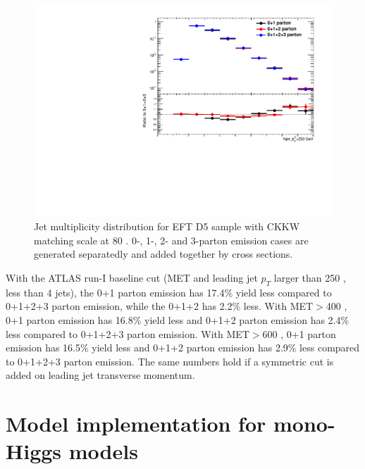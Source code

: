 \begin{figure}[h!]
	\centering  
	\includegraphics[width=0.8\linewidth]{figures/monojet_appendix/h_njet250.pdf}
	\caption{Jet multiplicity distribution for EFT D5 sample with CKKW matching scale at 80 \gev. 0-, 1-, 2- and 3-parton emission cases are generated separatedly and added together by cross sections.}
	\label{fig:RatioKine_D5_2}
\end{figure}

With the ATLAS run-I baseline cut (MET and leading jet $p_{T}$ larger than 250 \gev, less than 4 jets), the 0+1 parton emission has 17.4\% yield less compared to 0+1+2+3 parton emission, while the 0+1+2 has 2.2\% less. With MET$>$400 \gev, 0+1 parton emission has 16.8\% yield less and 0+1+2 parton emission has 2.4\% less compared to 0+1+2+3 parton emission. With MET$>$600 \gev, 0+1 parton emission has 16.5\% yield less and 0+1+2 parton emission has 2.9\% less compared to 0+1+2+3 parton emission. The same numbers hold if a symmetric cut is added on leading jet transverse momentum.


\section{Model implementation for mono-Higgs models}


